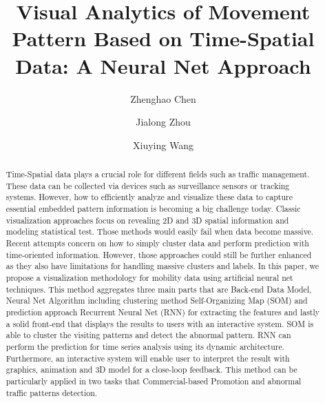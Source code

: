 \documentclass[runningheads,a4paper]{llncs}
\begin{document}
\title{Visual  Analytics  of  Movement Pattern Based on Time-Spatial Data: A Neural Net Approach}
%
%
\author{Zhenghao Chen\and Jialong Zhou\and Xiuying Wang}
%
%

%

\maketitle              %

\begin{abstract}
Time-Spatial data plays a crucial role for different fields such as traffic management. These data can be collected via devices such as surveillance sensors or tracking systems. However, how to efficiently analyze and visualize these data to capture essential embedded pattern information is becoming a big challenge today. Classic visualization approaches focus on revealing 2D and 3D spatial  information and modeling statistical test. Those methods would easily fail when data become massive. Recent attempts concern on how to simply cluster data and perform prediction with time-oriented information. However, those approaches could still be further enhanced as they also have limitations for handling massive clusters and labels. In this paper, we propose a visualization methodology for mobility data using artificial neural net techniques. This method aggregates three main parts that are Back-end Data Model, Neural Net Algorithm including clustering method Self-Organizing Map (SOM) and prediction approach Recurrent Neural Net (RNN) for extracting the features and lastly a solid front-end that displays the results to users with an interactive system. SOM is able to cluster the visiting patterns and detect the abnormal pattern. RNN can perform the prediction for time series analysis using its dynamic architecture. Furthermore, an interactive system will enable user to interpret the result with graphics, animation and 3D model for a close-loop feedback. This method can be particularly applied in two tasks that Commercial-based Promotion and abnormal traffic patterns detection. 
\end{abstract}
%
\end{document}
